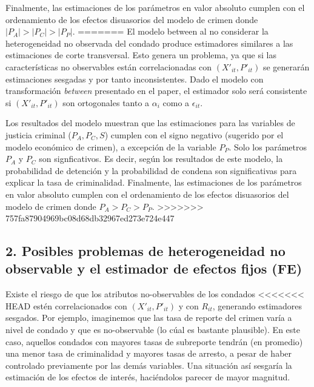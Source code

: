 \documentclass[
]{article}
\begin{document}
Finalmente, las estimaciones de los parámetros en valor absoluto cumplen
con el ordenamiento de los efectos disuasorios del modelo de crimen
donde \(|P_A|>|P_C|>|P_P|\).
=======
El modelo between al no considerar la heterogeneidad no observada del
condado produce estimadores similares a las estimaciones de corte
transversal. Esto genera un problema, ya que si las características no
observables están correlacionadas con \((X'_{it},P'_{it})\) se generarán
estimaciones sesgadas y por tanto inconsistentes. Dado el modelo con
transformación \emph{between} presentado en el paper, el estimador solo
será consistente si \((X'_{it},P'_{it})\) son ortogonales tanto a
\(\alpha_i\) como a \(\epsilon_{it}\).

Los resultados del modelo muestran que las estimaciones para las
variables de justicia criminal (\(P_A, P_C, S\)) cumplen con el signo
negativo (sugerido por el modelo económico de crimen), a excepción de la
variable \(P_P\). Solo los parámetros \(P_A\) y \(P_C\) son
signficativos. Es decir, según los resultados de este modelo, la
probabilidad de detención y la probabilidad de condena son
significativas para explicar la tasa de criminalidad. Finalmente, las
estimaciones de los parámetros en valor absoluto cumplen con el
ordenamiento de los efectos disuasorios del modelo de crimen donde
\(P_A>P_C>P_P\).
>>>>>>> 757fa87904969bc08d68db32967ed273e724e447

\hypertarget{posibles-problemas-de-heterogeneidad-no-observable-y-el-estimador-de-efectos-fijos-fe}{%
\subsection{2. Posibles problemas de heterogeneidad no observable y el
estimador de efectos fijos
(FE)}\label{posibles-problemas-de-heterogeneidad-no-observable-y-el-estimador-de-efectos-fijos-fe}}

Existe el riesgo de que los atributos no-observables de los condados
<<<<<<< HEAD
estén correlacionados con \((X'_{it},P'_{it})\) y con \(R_{it}\),
generando estimadores sesgados. Por ejemplo, imaginemos que las tasa de
reporte del crimen varía a nivel de condado y que es no-observable (lo
cúal es bastante plausible). En este caso, aquellos condados con mayores
tasas de subreporte tendrán (en promedio) una menor tasa de criminalidad
y mayores tasas de arresto, a pesar de haber controlado previamente por
las demás variables. Una situación así sesgaría la estimación de los
efectos de interés, haciéndolos parecer de mayor magnitud.
\end{document}
